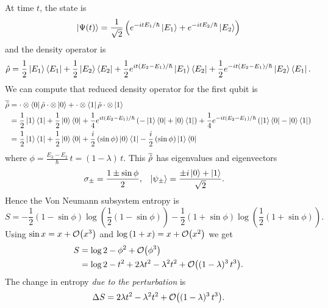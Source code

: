 At time \(t\), the state is
\[
\left|\Psi(t)\right\rangle = \frac{1}{\sqrt{2}}\left(e^{-itE_1/\hbar}\left|E_1\right\rangle + e^{-itE_2/\hbar} \left|E_2\right\rangle\right)
\]
and the density operator is
\[
\hat{\rho} = \frac{1}{2}\left|E_1\right\rangle\left\langle E_1\right| + \frac{1}{2}\left|E_2\right\rangle\left\langle E_2\right| + \frac{1}{2} e^{it\left(E_2-E_1\right)/\hbar} \left|E_1\right\rangle\left\langle E_2\right| + \frac{1}{2} e^{-it\left(E_2 - E_1\right)/\hbar} \left|E_2\right\rangle\left\langle E_1\right|.
\]
We can compute that reduced density operator for the first qubit is
\begin{align*}
\overline{\hat{\rho}} &= \cdot\otimes\left\langle0\right| \hat{\rho} \cdot\otimes\left|0\right\rangle + \cdot\otimes\left\langle1\right| \hat{\rho} \cdot\otimes\left|1\right\rangle \\
&= \frac{1}{2} \left|1\right\rangle\left\langle1\right| + \frac{1}{2}\left|0\right\rangle\left\langle0\right| + \frac{1}{4} e^{it\left(E_2-E_1\right)/\hbar}\left(-\left|1\right\rangle\left\langle0\right| + \left|0\right\rangle\left\langle1\right|\right) + \frac{1}{4} e^{-it\left(E_2-E_1\right)/\hbar}\left(\left|1\right\rangle\left\langle0\right| - \left|0\right\rangle\left\langle1\right|\right) \\
&= \frac{1}{2}\left|1\right\rangle\left\langle1\right| + \frac{1}{2}\left|0\right\rangle\left\langle0\right| + \frac{i}{2} \left(\sin \phi\right) \left|0\right\rangle\left\langle1\right| - \frac{i}{2} \left(\sin \phi\right) \left|1\right\rangle\left\langle0\right|
\end{align*}
where \(\phi = \frac{E_3-E_2}{\hbar}\,t = (1-\lambda)\,t\).
This \(\overline{\hat{\rho}}\) has eigenvalues and eigenvectors
\begin{align*}
\sigma_{\pm} &= \frac{1 \pm \sin \phi}{2}, &
\left|\psi_\pm\right\rangle &= \frac{\pm i \left|0\right\rangle + \left|1\right\rangle}{\sqrt{2}}.
\end{align*}
Hence the Von Neumann subsystem entropy is
\[
S = - \frac{1}{2}\left(1-\sin\phi\right) \log \left(\frac{1}{2}\left(1-\sin\phi\right)\right) - \frac{1}{2}\left(1+\sin\phi\right) \log \left(\frac{1}{2}\left(1+\sin\phi\right)\right).
\]
Using \(\sin x = x + \mathcal{O}{\left(x^3\right)}\) and \(\log\left(1+x\right) = x + \mathcal{O}{\left(x^2\right)}\) we get
\begin{align*}
S &= \log 2 - \phi^2 + \mathcal{O}{\left(\phi^3\right)} \\
&= \log 2 - t^2 + 2 \lambda t^2 - \lambda^2 t^2 + \mathcal{O}{\left((1-\lambda)^3\,t^3\right)}.
\end{align*}
The change in entropy \emph{due to the perturbation} is
\[
\Delta S = 2 \lambda t^2 - \lambda^2 t^2 + \mathcal{O}{\left((1-\lambda)^3\,t^3\right)}.
\]

